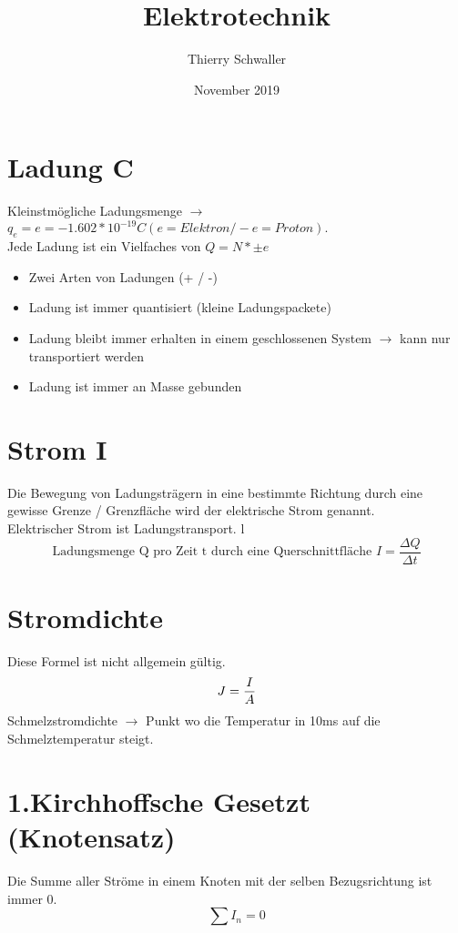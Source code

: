 \documentclass{article}
\title{Elektrotechnik}
\author{Thierry Schwaller}
\date{November 2019}
\begin{document}
	\section{Ladung C}
	Kleinstmögliche Ladungsmenge $\rightarrow$ $q_{e} = e = -1.602 * 10^{-19}C (e = Elektron / -e = Proton).$ \\
	Jede Ladung ist ein Vielfaches von $Q = N * \pm e$
	\begin{itemize}
		\item Zwei Arten von Ladungen (+ / -)
		\item Ladung ist immer quantisiert (kleine Ladungspackete)
		\item Ladung bleibt immer erhalten in einem geschlossenen System $\rightarrow$ kann nur transportiert werden
		\item Ladung ist immer an Masse gebunden
	\end{itemize}
	\section{Strom I}
	Die Bewegung von Ladungsträgern in eine bestimmte Richtung durch eine gewisse Grenze / Grenzfläche wird der elektrische Strom genannt. \\
	Elektrischer Strom ist Ladungstransport.  l
	\begin{equation}
		\textrm{Ladungsmenge Q pro Zeit t durch eine Querschnittfläche } I = \frac{\Delta Q}{\Delta t}
	\end{equation}
	\section{Stromdichte}
	Diese Formel ist nicht allgemein gültig.
	\begin{equation}
		J = \frac{I}{A} \\
	\end{equation}
	Schmelzstromdichte $\rightarrow$ Punkt wo die Temperatur in 10ms auf die Schmelztemperatur steigt.
	\section{1.Kirchhoffsche Gesetzt (Knotensatz)}
	Die Summe aller Ströme in einem Knoten mit der selben Bezugsrichtung ist immer 0. \\
	\begin{equation}
		\sum I_{n} = 0
	\end{equation}
\end{document}
